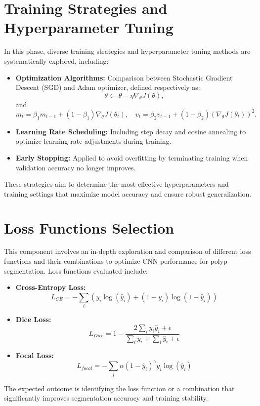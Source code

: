 \section{Training Strategies and Hyperparameter Tuning}
In this phase, diverse training strategies and hyperparameter tuning methods are systematically explored, including:
\begin{itemize}
    \item \textbf{Optimization Algorithms:} Comparison between Stochastic Gradient Descent (SGD) and Adam optimizer, defined respectively as:
    \begin{equation}
        \theta \leftarrow \theta - \eta \nabla_\theta J(\theta),
    \end{equation}
    and
    \begin{equation}
        m_t = \beta_1 m_{t-1} + (1-\beta_1) \nabla_\theta J(\theta_t), \quad v_t = \beta_2 v_{t-1} + (1-\beta_2) (\nabla_\theta J(\theta_t))^2.
    \end{equation}

    \item \textbf{Learning Rate Scheduling:} Including step decay and cosine annealing to optimize learning rate adjustments during training.
    \item \textbf{Early Stopping:} Applied to avoid overfitting by terminating training when validation accuracy no longer improves.
\end{itemize}
These strategies aim to determine the most effective hyperparameters and training settings that maximize model accuracy and ensure robust generalization.


\section{Loss Functions Selection}
This component involves an in-depth exploration and comparison of different loss functions and their combinations to optimize CNN performance for polyp segmentation. Loss functions evaluated include:
\begin{itemize}
    \item \textbf{Cross-Entropy Loss:}
    \begin{equation}
        L_{CE} = -\sum_{i}(y_i \log(\hat{y}_i) + (1 - y_i)\log(1 - \hat{y}_i))
    \end{equation}
    \item \textbf{Dice Loss:}
    \begin{equation}
        L_{Dice} = 1 - \frac{2 \sum_i y_i \hat{y}_i + \epsilon}{\sum_i y_i + \sum_i \hat{y}_i + \epsilon}
    \end{equation}
    \item \textbf{Focal Loss:}
    \begin{equation}
        L_{focal} = -\sum_i \alpha (1 - \hat{y}_i)^\gamma y_i \log(\hat{y}_i)
    \end{equation}
\end{itemize}
The expected outcome is identifying the loss function or a combination that significantly improves segmentation accuracy and training stability.



